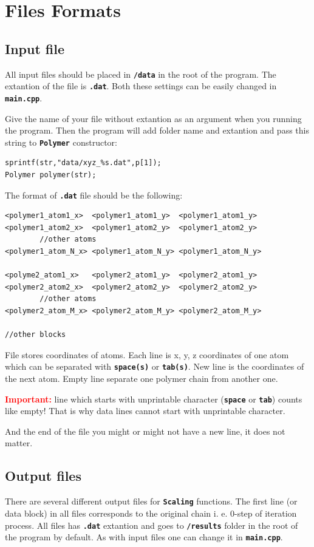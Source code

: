 \documentclass[12pt]{article}
\newcommand{\comp}[1]{\textbf{\texttt {#1}}}%
\newcommand{\important}{\textcolor{Red}{\textbf{Important: }}}
\newcommand{\enterProblemHeader}[1]{
\nobreak\extramarks{#1}{}\nobreak
}
\newcommand{\exitProblemHeader}[1]{
}
\newcounter{homeworkProblemCounter} %
\newcommand{\homeworkProblemName}{}
\newenvironment{homeworkProblem}[1][Problem \arabic{homeworkProblemCounter}]{ %
\stepcounter{homeworkProblemCounter} %
\renewcommand{\homeworkProblemName}{#1} %
\section{\homeworkProblemName} %
\setlength\parindent{18pt}
\enterProblemHeader{\homeworkProblemName} %
}{
}
\begin{document}
\begin{homeworkProblem}[Files Formats]

\subsection{Input file}\label{sec:inputFile}
All input files should be placed in \comp{/data} in the root of the program. The extantion of the file is \comp{.dat}. Both these settings can be easily changed in \comp{main.cpp}.

Give the name of your file without extantion as an argument when you running the program. Then the program will add folder name and extantion and pass this string to \comp{Polymer} constructor:

\begin{lstlisting}
sprintf(str,"data/xyz_%s.dat",p[1]);
Polymer polymer(str);
\end{lstlisting}

The format of  \comp{.dat} file should be the following:

\begin{lstlisting}
<polymer1_atom1_x>	<polymer1_atom1_y>	<polymer1_atom1_y>
<polymer1_atom2_x>	<polymer1_atom2_y>	<polymer1_atom2_y>
		//other atoms	
<polymer1_atom_N_x>	<polymer1_atom_N_y>	<polymer1_atom_N_y>

<polyme2_atom1_x>	<polymer2_atom1_y>	<polymer2_atom1_y>
<polymer2_atom2_x>	<polymer2_atom2_y>	<polymer2_atom2_y>
		//other atoms	
<polymer2_atom_M_x>	<polymer2_atom_M_y>	<polymer2_atom_M_y>

//other blocks
\end{lstlisting}

File stores coordinates of atoms. Each line is x, y, z coordinates of one atom which can be separated with \comp{space(s)} or \comp{tab(s)}. New line is the coordinates of the next atom. Empty line separate one polymer chain from another one.

\important line which starts with unprintable character (\comp{space} or \comp{tab}) counts like empty! That is why data lines cannot start with unprintable character.

And the end of the file you might or might not have a new line, it does not matter.

\subsection{Output files}\label{ssec:outputFiles}
There are several different output files for \comp{Scaling} functions. The first line (or data block) in all files corresponds to the original chain i. e. 0-step of iteration process.
All files has \comp{.dat} extantion and goes to \comp{/results} folder in the root of the program by default. As with input files one can change it in \comp{main.cpp}.


\end{homeworkProblem}
\end{document}

